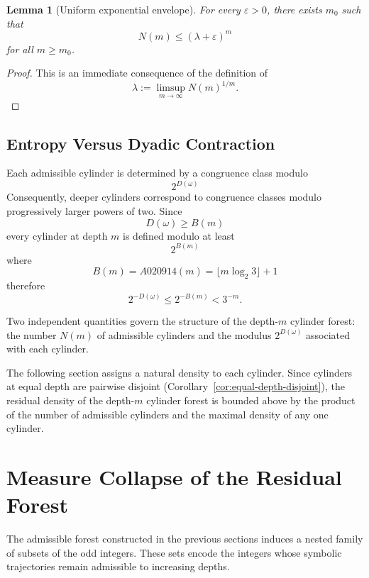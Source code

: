 \documentclass[12pt, oneside]{article}
\numberwithin{equation}{section}
\theoremstyle{definition}
\theoremstyle{plain}
\newtheorem{lemma}[theorem]{Lemma}
\theoremstyle{remark}
\begin{document}
\begin{lemma}[Uniform exponential envelope]
\label{lem:uniform-envelope}
For every \(\varepsilon>0\), there exists \(m_0\) such that
\[
N(m) \le (\lambda+\varepsilon)^m
\]
for all \(m\ge m_0\).
\end{lemma}

\begin{proof}
This is an immediate consequence of the definition of
\[
\lambda := \limsup_{m\to\infty} N(m)^{1/m}.
\]
\end{proof}

\subsection{Entropy Versus Dyadic Contraction}

Each admissible cylinder is determined by a congruence class modulo
\[
2^{D(\omega)}
\]
Consequently, deeper cylinders correspond to congruence classes modulo
progressively larger powers of two. Since
\[
D(\omega) \ge B(m)
\]
every cylinder at depth \(m\) is defined modulo at least
\[
2^{B(m)}
\]
where
\[
B(m) = A020914(m) = \lfloor m\log_2 3\rfloor + 1
\]
therefore
\[
2^{-D(\omega)} \le 2^{-B(m)} < 3^{-m}.
\]

Two independent quantities govern the structure of the depth-\(m\) cylinder
forest: the number \(N(m)\) of admissible cylinders and the modulus
\(2^{D(\omega)}\) associated with each cylinder.

The following section assigns a natural density to each cylinder.
Since cylinders at equal depth are pairwise disjoint
(Corollary~\ref{cor:equal-depth-disjoint}), the residual density of
the depth-\(m\) cylinder forest is bounded above by the product of the
number of admissible cylinders and the maximal density of any one cylinder.


\section{Measure Collapse of the Residual Forest}
\label{sec:measure-collapse}

The admissible forest constructed in the previous sections induces a
nested family of subsets of the odd integers. These sets encode the
integers whose symbolic trajectories remain admissible to increasing
depths.
\end{document}
